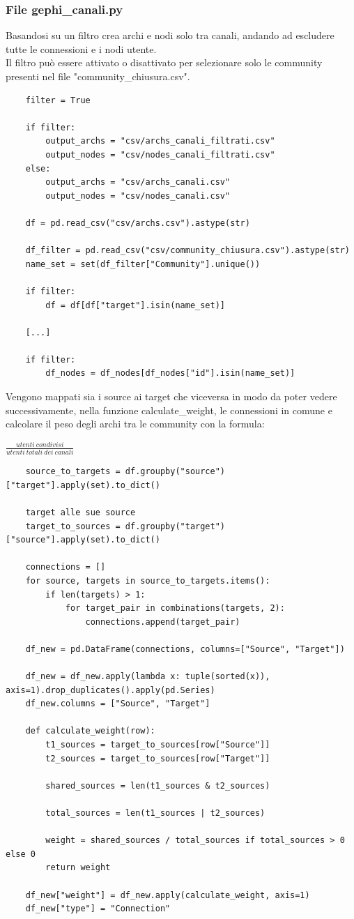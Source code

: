 \documentclass[12pt]{article}
\begin{document}
	\subsubsection{File gephi\_canali.py}
	Basandosi su un filtro crea archi e nodi solo tra canali, andando ad escludere tutte le connessioni e i nodi utente.\\
	Il filtro può essere attivato o disattivato per selezionare solo le community presenti nel file "community\_chiusura.csv".
	\begin{lstlisting}
	filter = True
	
	if filter:
		output_archs = "csv/archs_canali_filtrati.csv"
		output_nodes = "csv/nodes_canali_filtrati.csv"
	else:
		output_archs = "csv/archs_canali.csv"
		output_nodes = "csv/nodes_canali.csv"
	
	df = pd.read_csv("csv/archs.csv").astype(str)
	
	df_filter = pd.read_csv("csv/community_chiusura.csv").astype(str)
	name_set = set(df_filter["Community"].unique())
	
	if filter:
		df = df[df["target"].isin(name_set)]
	
	[...]
	
	if filter:
		df_nodes = df_nodes[df_nodes["id"].isin(name_set)]
	\end{lstlisting}
	Vengono mappati sia i source ai target che viceversa in modo da poter vedere successivamente, nella funzione calculate\_weight, le connessioni in comune e calcolare il peso degli archi tra le community con la formula: \begin{center}
		\Large{$\frac{utenti\ condivisi}{utenti\ totali\ dei\ canali}$}
	\end{center}
	\vspace{0.5cm}
	\begin{lstlisting}
	source_to_targets = df.groupby("source")["target"].apply(set).to_dict()
	
	target alle sue source
	target_to_sources = df.groupby("target")["source"].apply(set).to_dict()
	
	connections = []
	for source, targets in source_to_targets.items():
		if len(targets) > 1:
			for target_pair in combinations(targets, 2):
				connections.append(target_pair)
	
	df_new = pd.DataFrame(connections, columns=["Source", "Target"])
	
	df_new = df_new.apply(lambda x: tuple(sorted(x)), axis=1).drop_duplicates().apply(pd.Series)
	df_new.columns = ["Source", "Target"]
	
	def calculate_weight(row):
		t1_sources = target_to_sources[row["Source"]]
		t2_sources = target_to_sources[row["Target"]]
	
		shared_sources = len(t1_sources & t2_sources)
	
		total_sources = len(t1_sources | t2_sources)
	
		weight = shared_sources / total_sources if total_sources > 0 else 0
		return weight
	
	df_new["weight"] = df_new.apply(calculate_weight, axis=1)
	df_new["type"] = "Connection"
	\end{lstlisting}
\end{document}
